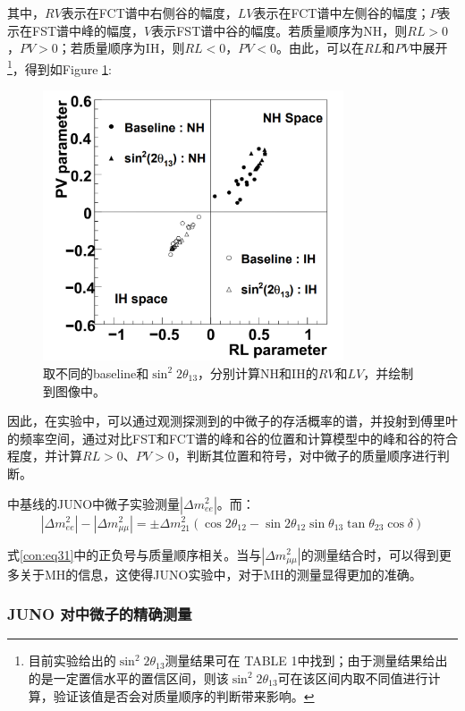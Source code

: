 \documentclass[10pt,a4paper]{article}
\begin{document}
其中，$RV$表示在FCT谱中右侧谷的幅度，$LV$表示在FCT谱中左侧谷的幅度；$P$表示在FST谱中峰的幅度，$V$表示FST谱中谷的幅度。若质量顺序为NH，则$RL>0$，$PV>0$；若质量顺序为IH，则$RL<0$，$PV<0$。由此，可以在$RL$和$PV$中展开\footnote{目前实验给出的$\sin^2 2\theta_{13}$测量结果可在\cite{Zhan:2008id} TABLE 1中找到；由于测量结果给出的是一定置信水平的置信区间，则该$\sin^2 2\theta_{13}$可在该区间内取不同值进行计算，验证该值是否会对质量顺序的判断带来影响。}，得到如Figure \ref{fig:33}:

\begin{figure}[H]
 \centering
 \includegraphics[height=8cm]{images/PVRL.png}
 \caption{取不同的baseline和$\sin^2 2\theta_{13}$，分别计算NH和IH的$RV$和$LV$，并绘制到图像中。}
 \label{fig:33}
\end{figure}


因此，在实验中，可以通过观测探测到的中微子的存活概率的谱，并投射到傅里叶的频率空间，通过对比FST和FCT谱的峰和谷的位置和计算模型中的峰和谷的符合程度，并计算$RL>0$、$PV>0$，判断其位置和符号，对中微子的质量顺序进行判断。


中基线的JUNO中微子实验测量$|\Delta{m_{ee}^2}|$。而：
\begin{equation}
\label{con:eq31}
|\Delta{m_{ee}^2}|-|\Delta {m^{2}_{\mu \mu}}|=\pm \Delta m_{21}^2(\cos2\theta_{12}-\sin2\theta_{12}\sin\theta_{13}\tan\theta_{23}\cos\delta)
\end{equation}


式\eqref{con:eq31}中的正负号与质量顺序相关。当与$|\Delta{m_{\mu\mu}^2}|$的测量结合时，可以得到更多关于MH的信息，这使得JUNO实验中，对于MH的测量显得更加的准确\cite{2016Neutrino}。

\subsubsection{JUNO 对中微子的精确测量}\label{sub:1}
\end{document}
